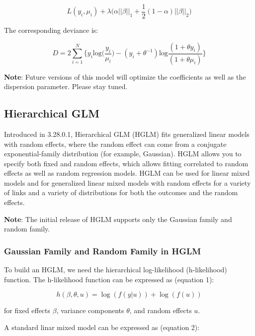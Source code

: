 $$ L(y_i, \mu_i) + \lambda \big(\alpha || \beta || _1 + \frac{1}{2} (1 - \alpha) || \beta || _2 \big)$$

The corresponding deviance is:

$$D = 2 \sum_{i=1}^{N} \bigg \{ y_i \text{log} \big(\frac{y_i}{\mu_i} \big) - (y_i + \theta^{-1}) \text{log} \frac{(1+\theta y_i)}{(1+\theta \mu_i)} \bigg \}$$

\textbf{Note}: Future versions of this model will optimize the coefficients as well as the dispersion parameter. Please stay tuned.

\newpage
\waterExampleInR


\waterExampleInPython


\subsection{Hierarchical GLM}

Introduced in 3.28.0.1, Hierarchical GLM (HGLM) fits generalized linear models with random effects, where the random effect can come from a conjugate exponential-family distribution (for example, Gaussian). HGLM allows you to specify both fixed and random effects, which allows fitting correlated to random effects as well as random regression models. HGLM can be used for linear mixed models and for generalized linear mixed models with random effects for a variety of links and a variety of distributions for both the outcomes and the random effects.

\textbf{Note}: The initial release of HGLM supports only the Gaussian family and random family.

\subsubsection{Gaussian Family and Random Family in HGLM}

To build an HGLM, we need the hierarchical log-likelihood (h-likelihood) function. The h-likelihood function can be expressed as (equation 1):

$$h(\beta, \theta, u) = \log(f (y|u)) + \log (f(u))$$

for fixed effects $\beta$, variance components $\theta$, and random effects $u$.

A standard linar mixed model can be expressed as (equation 2):

